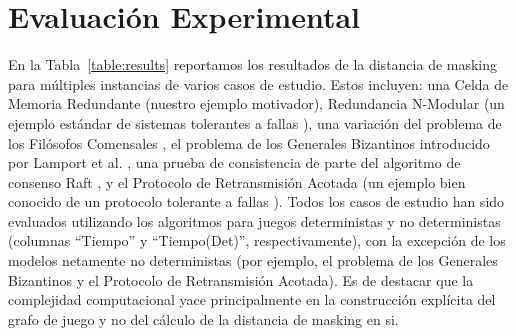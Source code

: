 \section{Evaluación Experimental} \label{sec:experimental_eval}


En la Tabla~\ref{table:results} reportamos los resultados de la distancia de masking para múltiples instancias de varios casos de estudio. Estos incluyen: una Celda de Memoria Redundante (nuestro ejemplo motivador), Redundancia N-Modular (un ejemplo estándar de sistemas tolerantes a fallas \cite{ShoomanBook}), una variación del problema de los Filósofos Comensales \cite{Dijkstra71}, el problema de los Generales Bizantinos introducido por Lamport et al. \cite{LamportSP82}, una prueba de consistencia de parte del algoritmo de consenso Raft \cite{OngaroO14}, y el Protocolo de Retransmisión Acotada (un ejemplo bien conocido de un protocolo tolerante a fallas \cite{GrooteP96}). Todos los casos de estudio han sido evaluados utilizando los algoritmos para juegos deterministas y no deterministas (columnas ``Tiempo'' y ``Tiempo(Det)'', respectivamente), con la excepción de los modelos netamente no deterministas (por ejemplo, el problema de los Generales Bizantinos y el Protocolo de Retransmisión Acotada). Es de destacar que la complejidad computacional yace principalmente en la construcción explícita del grafo de juego y no del cálculo de la distancia de masking en si.

